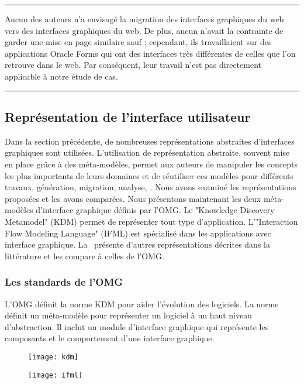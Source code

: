 \documentclass[a4paper]{article}
\begin{document}
\noindent\hfil\rule{8cm}{0.5pt}\hfil

Aucun des auteurs n'a envisagé la migration des interfaces graphiques du web vers des interfaces graphiques du web.
De plus, aucun n'avait la contrainte de garder une mise en page similaire sauf \citet{Sanc14a} ; 
  cependant, ils travaillaient sur des applications Oracle Forms qui ont des interfaces très différentes de celles que l'on retrouve dans le web.
Par conséquent, leur travail n'est pas directement applicable à notre étude de cas.

\noindent\hfil\rule{8cm}{0.5pt}\hfil

\subsection{Représentation de l'interface utilisateur}
\label{sec:position}

Dans la section précédente, de nombreuses représentations abstraites d'interfaces graphiques sont utilisées.
L'utilisation de représentation abstraite, souvent mise en place grâce à des méta-modèles, permet aux auteurs
  de manipuler les concepts les plus importants de leurs domaines et de réutiliser ces modèles pour différents travaux, \eg génération, migration, analyse, \etc.
Nous avons examiné les représentations proposées et les avons comparées.
Nous présentons maintenant les deux méta-modèles d'interface graphique définis par l'OMG. 
Le "Knowledge Discovery Metamodel" (KDM) permet de représenter tout type d'application.
L'"Interaction Flow Modeling Language" (IFML) est spécialisé dans les applications avec interface graphique.
La~ présente d'autres représentations décrites dans la littérature et les compare à celles de l'OMG.

\subsubsection{Les standards de l'OMG}
\label{sec:omg}

L'OMG définit la norme KDM pour aider l'évolution des logiciels.
La norme définit un méta-modèle pour représenter un logiciel à un haut niveau d'abstraction.
Il inclut un module d'interface graphique qui représente les composants et le comportement d'une interface graphique.

\begin{figure}
    \centering
    \begin{minipage}{.5\textwidth}
      \centering
      \texttt{[image: kdm]}
      \label{fig:kdm}
    \end{minipage}%
    \begin{minipage}{.5\textwidth}
      \centering
      \texttt{[image: ifml]}
      \label{fig:ifml}
    \end{minipage}
\end{figure}
\end{document}
